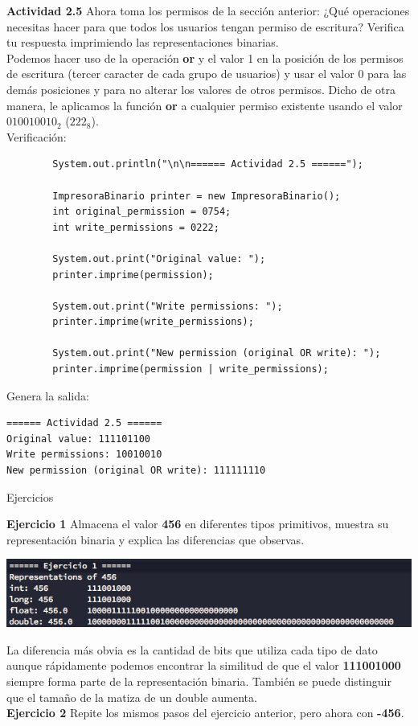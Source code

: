 \documentclass[11pt,letterpaper]{article}
\begin{document}
\textbf{Actividad 2.5} Ahora toma los permisos de la sección anterior: ¿Qué
operaciones necesitas hacer para que todos los usuarios tengan permiso de
escritura? Verifica tu respuesta imprimiendo las representaciones binarias. \\

    Podemos hacer uso de la operación \textbf{or} y el valor 1 en la posición
    de los permisos de escritura (tercer caracter de cada grupo de usuarios)
    y usar el valor 0 para las demás posiciones y para no alterar los valores
    de otros permisos. Dicho de otra manera, le aplicamos la función \textbf{or}
    a cualquier permiso existente usando el valor \textbf{$010010010_2$} ($222_8$). \\

    \clearpage
    Verificación:

    \begin{verbatim}
        System.out.println("\n\n====== Actividad 2.5 ======");

        ImpresoraBinario printer = new ImpresoraBinario();
        int original_permission = 0754;
        int write_permissions = 0222;

        System.out.print("Original value: ");
        printer.imprime(permission);

        System.out.print("Write permissions: ");
        printer.imprime(write_permissions);

        System.out.print("New permission (original OR write): ");
        printer.imprime(permission | write_permissions);
    \end{verbatim}

    Genera la salida:
    \begin{verbatim}
====== Actividad 2.5 ======
Original value: 111101100
Write permissions: 10010010
New permission (original OR write): 111111110
    \end{verbatim}

{\LARGE Ejercicios \par}

\textbf{Ejercicio 1} Almacena el valor \textbf{456} en diferentes tipos primitivos,
muestra su representación binaria y explica las diferencias que observas. \\

    \begin{center}
        \includegraphics[scale=.7]{assets/img/e-1.png}
    \end{center}

    La diferencia más obvia es la cantidad de bits que utiliza cada tipo de dato aunque
    rápidamente podemos encontrar la similitud de que el valor \textbf{111001000} siempre
    forma parte de la representación binaria. También se puede distinguir que el tamaño
    de la matiza de un double aumenta.\\

\textbf{Ejercicio 2} Repite los mismos pasos del ejercicio anterior, pero ahora con \textbf{-456}.
\end{document}
